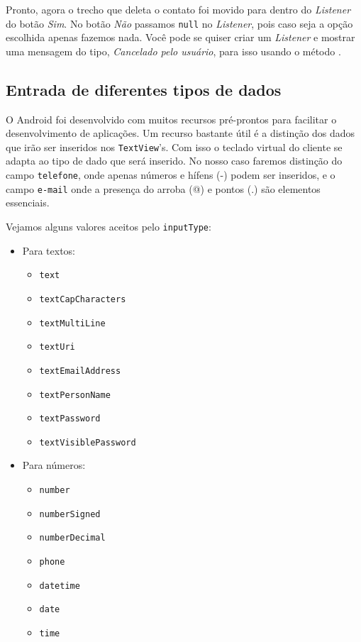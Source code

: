 Pronto, agora o trecho que deleta o contato foi movido para dentro do \textit{Listener} do botão
\textit{Sim}. No botão \textit{Não} passamos \texttt{null} no \textit{Listener}, pois caso
seja a opção escolhida apenas fazemos nada. Você pode se quiser criar um \textit{Listener} e mostrar
uma mensagem do tipo, \textit{Cancelado pelo usuário}, para isso usando o método .


\subsection{Entrada de diferentes tipos de dados}

O Android foi desenvolvido com muitos recursos pré-prontos para facilitar o desenvolvimento de aplicações.
Um recurso bastante útil é a distinção dos dados que irão ser inseridos nos \texttt{TextView}'s. Com isso
o teclado virtual do cliente se adapta ao tipo de dado que será inserido. No nosso caso faremos distinção
do campo \texttt{telefone}, onde apenas números e hífens (-) podem ser inseridos, e o campo \texttt{e-mail}
onde a presença do arroba (@) e pontos (.) são elementos essenciais.

Vejamos alguns valores aceitos pelo \texttt{inputType}:

\begin{itemize}

  \item Para textos:
  \begin{itemize}
    \item \texttt{text}
    \item \texttt{textCapCharacters}
    \item \texttt{textMultiLine}
    \item \texttt{textUri}
    \item \texttt{textEmailAddress}
    \item \texttt{textPersonName}
    \item \texttt{textPassword}
    \item \texttt{textVisiblePassword}
  \end{itemize}

  \item Para números:
  \begin{itemize}
    \item \texttt{number}
    \item \texttt{numberSigned}
    \item \texttt{numberDecimal}
    \item \texttt{phone}
    \item \texttt{datetime}
    \item \texttt{date}
    \item \texttt{time}
  \end{itemize}

\end{itemize}


